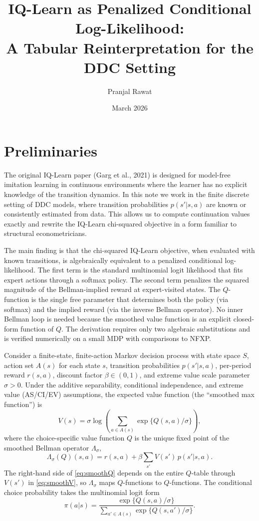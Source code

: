\documentclass[11pt]{article}
\title{IQ-Learn as Penalized Conditional Log-Likelihood:\\A Tabular Reinterpretation for the DDC Setting}
\author{Pranjal Rawat}
\date{March 2026}
\begin{document}
\maketitle

\section{Preliminaries}

The original IQ-Learn paper (Garg et al., 2021) is designed for model-free imitation learning in continuous environments where the learner has no explicit knowledge of the transition dynamics. In this note we work in the finite discrete setting of DDC models, where transition probabilities $p(s'|s,a)$ are known or consistently estimated from data. This allows us to compute continuation values exactly and rewrite the IQ-Learn chi-squared objective in a form familiar to structural econometricians.

The main finding is that the chi-squared IQ-Learn objective, when evaluated with known transitions, is algebraically equivalent to a penalized conditional log-likelihood. The first term is the standard multinomial logit likelihood that fits expert actions through a softmax policy. The second term penalizes the squared magnitude of the Bellman-implied reward at expert-visited states. The $Q$-function is the single free parameter that determines both the policy (via softmax) and the implied reward (via the inverse Bellman operator). No inner Bellman loop is needed because the smoothed value function is an explicit closed-form function of $Q$. The derivation requires only two algebraic substitutions and is verified numerically on a small MDP with comparisons to NFXP.

Consider a finite-state, finite-action Markov decision process with state space $S$, action set $A(s)$ for each state $s$, transition probabilities $p(s'|s,a)$, per-period reward $r(s,a)$, discount factor $\beta \in (0,1)$, and extreme value scale parameter $\sigma > 0$. Under the additive separability, conditional independence, and extreme value (AS/CI/EV) assumptions, the expected value function (the ``smoothed max function'') is
\begin{equation}
V(s) = \sigma \log\!\left(\sum_{a \in A(s)} \exp\{Q(s,a)/\sigma\}\right),
\label{eq:smoothV}
\end{equation}
where the choice-specific value function $Q$ is the unique fixed point of the smoothed Bellman operator $\Lambda_\sigma$,
\begin{equation}
\Lambda_\sigma(Q)(s,a) = r(s,a) + \beta \sum_{s'} V(s')\, p(s'|s,a).
\label{eq:smoothQ}
\end{equation}
The right-hand side of \eqref{eq:smoothQ} depends on the entire $Q$-table through $V(s')$ in \eqref{eq:smoothV}, so $\Lambda_\sigma$ maps $Q$-functions to $Q$-functions.
The conditional choice probability takes the multinomial logit form
\begin{equation}
\pi(a|s) = \frac{\exp\{Q(s,a)/\sigma\}}{\sum_{a' \in A(s)} \exp\{Q(s,a')/\sigma\}}.
\label{eq:ccp}
\end{equation}
\end{document}

